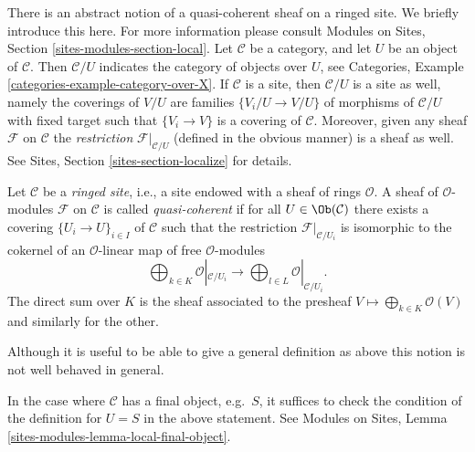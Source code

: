 \noindent
There is an abstract notion of a quasi-coherent sheaf on a ringed site.
We briefly introduce this here. For more information please consult
Modules on Sites, Section \ref{sites-modules-section-local}.
Let $\mathcal{C}$ be a category, and let $U$ be an object of $\mathcal{C}$.
Then $\mathcal{C}/U$ indicates the category of objects over $U$, see
Categories, Example \ref{categories-example-category-over-X}.
If $\mathcal{C}$ is a site, then $\mathcal{C}/U$ is a site as well, namely
the coverings of $V/U$ are families $\{V_i/U \to V/U\}$ of morphisms
of $\mathcal{C}/U$ with fixed target such that
$\{V_i \to V\}$ is a covering of $\mathcal{C}$. Moreover, given any
sheaf $\mathcal{F}$ on $\mathcal{C}$ the {\it restriction}
$\mathcal{F}|_{\mathcal{C}/U}$ (defined in the obvious manner)
is a sheaf as well. See
Sites, Section \ref{sites-section-localize}
for details.

\begin{definition}
\label{definition-ringed-site}
Let $\mathcal{C}$ be a {\it ringed site}, i.e., a site endowed with a
sheaf of rings $\mathcal{O}$. A sheaf of $\mathcal{O}$-modules $\mathcal{F}$ on
$\mathcal{C}$ is called {\it quasi-coherent} if for all
$U \in \Ob(\mathcal{C})$ there exists a covering
$\{U_i \to U\}_{i\in I}$ of $\mathcal{C}$ such that the restriction
$\mathcal{F}|_{\mathcal{C}/U_i}$ is isomorphic to the cokernel of
an $\mathcal{O}$-linear map of free $\mathcal{O}$-modules
$$
\bigoplus\nolimits_{k \in K} \mathcal{O}|_{\mathcal{C}/U_i}
\longrightarrow
\bigoplus\nolimits_{l \in L} \mathcal{O}|_{\mathcal{C}/U_i}.
$$
The direct sum over $K$ is the sheaf associated to the presheaf
$V \mapsto \bigoplus_{k \in K} \mathcal{O}(V)$ and similarly for the other.
\end{definition}

\noindent
Although it is useful to be able to give a general definition as above
this notion is not well behaved in general.

\begin{remark}
\label{remark-final-object}
In the case where $\mathcal{C}$ has a final object, e.g.\ $S$, it
suffices to check the condition of the definition for
$U = S$ in the above statement. See
Modules on Sites, Lemma \ref{sites-modules-lemma-local-final-object}.
\end{remark}

